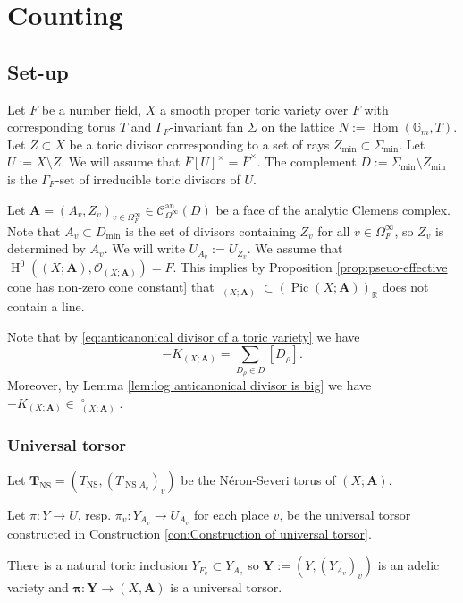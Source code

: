 \documentclass[a4paper,11pt,reqno]{amsart}
\newcommand{\R}{\mathbb{R}}
\newcommand{\G}{\mathbb{G}}
\DeclareMathOperator{\Hom}{Hom}
\DeclareMathOperator{\Pic}{Pic}
\DeclareMathOperator{\NS}{NS}
\DeclareMathOperator{\Eff}{\overline{Eff}}
\DeclareMathOperator{\HH}{H}
\theoremstyle{definition}
\begin{document}
\section{Counting}
\subsection{Set-up}
Let $F$ be a number field, $X$ a smooth proper toric variety over $F$ with corresponding torus $T$ and $\Gamma_F$-invariant fan $\Sigma$ on the lattice $N := \Hom(\G_m, T)$. Let $Z \subset X$ be a toric divisor corresponding to a set of rays $Z_{\min} \subset \Sigma_{\min}$. Let $U := X \setminus Z$. We will assume that $\overline{F}[U]^{\times} = \overline{F}^{\times}$. The complement $D := \Sigma_{\min} \setminus Z_{\min}$ is the $\Gamma_F$-set of irreducible toric divisors of $U$.

Let $\mathbf{A} = (A_v, Z_v)_{v \in \Omega_F^{\infty}} \in \mathcal{C}^{\text{an}}_{\Omega^{\infty}}(D)$ be a face of the analytic Clemens complex. Note that $A_v \subset D_{\min}$ is the set of divisors containing $Z_v$ for all $v \in \Omega_F^{\infty}$, so $Z_v$ is determined by $A_v$. We will write $U_{A_v} := U_{Z_v}$. We assume that $\HH^0((X ; \mathbf{A}), \mathcal{O}_{(X ; \mathbf{A})}) = F$. This implies by Proposition \ref{prop:pseuo-effective cone has non-zero cone constant} that $\Eff_{(X ; \mathbf{A})} \subset (\Pic (X ; \mathbf{A}))_{\R}$ does not contain a line. 

Note that by \eqref{eq:anticanonical divisor of a toric variety} we have
\begin{equation}\label{eq:log-canonical divisor}
	-K_{(X; \mathbf{A})} = \sum_{D_{\rho} \in D} [D_{\rho}].
\end{equation}
Moreover, by Lemma \ref{lem:log anticanonical divisor is big} we have $-K_{(X; \mathbf{A})} \in \Eff_{(X ; \mathbf{A})}^{\circ}$.
\subsubsection{Universal torsor}
Let $\mathbf{T}_{\NS} = (T_{\NS}, (T_{\NS A_v})_v)$ be the N\'eron-Severi torus of $(X ; \mathbf{A})$.

Let $\pi: Y \to U$, resp. $\pi_v: Y_{A_v} \to U_{A_v}$ for each place $v$, be the universal torsor constructed in Construction \ref{con:Construction of universal torsor}.

There is a natural toric inclusion $Y_{F_v} \subset Y_{A_v}$ so $\mathbf{Y} := (Y, (Y_{A_v})_v)$ is an adelic variety and $\bm{\pi}: \mathbf{Y} \to (X, \mathbf{A})$ is a universal torsor.
\end{document}
